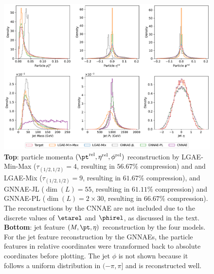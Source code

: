 \begin{figure}[ht!]
    \centering
    \includegraphics[width=\linewidth]{figures/06-ML4Jets/lgae/reconstructions/hist-cnnae.pdf}
    \caption[Particle and jet feature reconstruction by the LGAE, GNNAE, and CNNAE models.]{
        \textbf{Top}:
        particle momenta $(\pt^{\mathrm{rel}}, \eta^{\mathrm{rel}}, \phi^{\mathrm{rel}})$ reconstruction by
        LGAE-Min-Max ($\tau_{(1/2, 1/2)}=4$, resulting in $56.67\%$ compression) and
        and LGAE-Mix ($\tau_{(1/2, 1/2)}=9$, resulting in $61.67\%$ compression),
        and GNNAE-JL ($\dim(L) = 55$, resulting in $61.11\%$ compression) and
        GNNAE-PL ($\dim(L) = 2\times 30$, resulting in $66.67\%$ compression). The reconstructions by the CNNAE are not included due to the discrete values of $\etarel$ and $\phirel$, as discussed in the text.
        \textbf{Bottom}:
        jet feature $(M, \pt, \eta)$ reconstruction by the four models.
        For the jet feature reconstruction by the GNNAEs, the particle features in relative coordinates were transformed back to absolute coordinates before plotting.
        The jet $\phi$ is not shown because it follows a uniform distribution in $(-\pi, \pi]$ and is reconstructed well.
    }
    \label{fig:06_lgae_recons-hist}
\end{figure}

